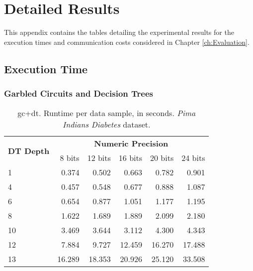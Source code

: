 
\chapter{Detailed Results}
\label{app:1}

This appendix contains the tables detailing the experimental results for the execution times and communication costs considered in Chapter \ref{ch:Evaluation}.

\section{Execution Time}
\subsection{Garbled Circuits and Decision Trees}
\label{app:gcdt_exec}


\begin{table}[!h]
\centering
\caption{\acs{gc}+\acs{dt}. Runtime per data sample, in seconds. \emph{Pima Indians Diabetes} dataset.}
\label{table:runtimeDTPID}
\vspace*{0.2cm}
\begin{tabular}{|l|r|r|r|r|r|}
\hline
\multirow{2}{*}{\textbf{DT Depth}} & \multicolumn{5}{c|}{\textbf{Numeric Precision}}         \\ \cline{2-6} 
                          & 8 bits & 12 bits & 16 bits & 20 bits & 24 bits \\ \hline
1                         & 0.374  & 0.502   & 0.663   & 0.782   & 0.901   \\ \hline
4                         & 0.457  & 0.548   & 0.677   & 0.888   & 1.087   \\ \hline
6                         & 0.654  & 0.877   & 1.051   & 1.177   & 1.195   \\ \hline
8                         & 1.622  & 1.689   & 1.889   & 2.099   & 2.180   \\ \hline
10                        & 3.469  & 3.644   & 3.112   & 4.300   & 4.343   \\ \hline
12                        & 7.884  & 9.727   & 12.459  & 16.270  & 17.488  \\ \hline
13                        & 16.289 & 18.353  & 20.926  & 25.120  & 33.508  \\ \hline
\end{tabular}
\end{table}

